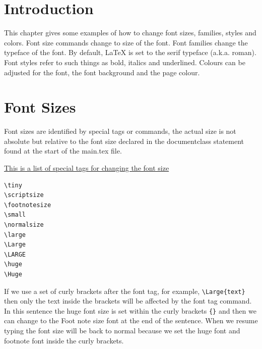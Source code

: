 



\section{Introduction}

This chapter gives some examples of how to change font sizes, families, styles and colors. Font size  commands change to size of the font. Font families change the typeface of the font. By default, LaTeX is set to the serif typeface (a.k.a. roman). Font styles refer to such things as bold, italics and underlined. Colours can be adjusted for the font, the font background and the page colour. 


\section{Font Sizes}

Font sizes are identified by special tags or commands, the actual size is not absolute but relative to the font size declared in the documentclass statement found at the start of the main.tex file.

\vspace{0.3cm}

\underline{This is a list of special tags for changing the font size}
\begin{verbatim}
\tiny 
\scriptsize
\footnotesize
\small
\normalsize
\large
\Large
\LARGE
\huge
\Huge
\end{verbatim}



If we use a set of curly brackets after the font tag, for example, \verb|\Large{text}| then only the text inside the brackets will be affected by the font tag command. In this sentence the {\huge huge font size} is set within the curly brackets \verb|{}| and then we can change to the {\footnotesize Foot note size font at the end of the sentence}. When we resume typing the font size will be back to normal because we set the huge font and footnote font inside the curly brackets. 

\vspace{0.3cm}

